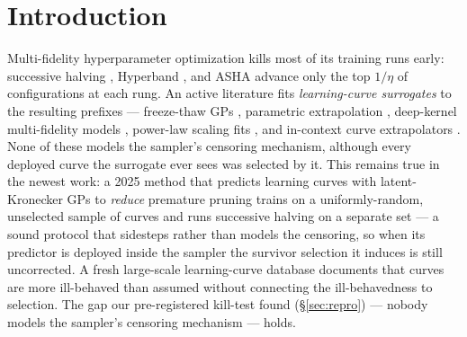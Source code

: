 \documentclass[10pt]{article}
\begin{document}
\begin{abstract}
posterior machinery cuts survivor-extrapolation bias at the first rung
from \ExtrapBiasNaive{} (naive least squares) to \ExtrapBiasHeckMB{};
a per-curve Tobit correction without the population prior manages only
\ExtrapBiasTobit{}, and an Arellano--Bond-flavoured lag-instrument
extrapolator is worse than the naive fit and is dropped. On LCBench and
PD1 replays the story is honestly mixed and matches the calibrated-noise
prediction: plain last-value SH is already near-optimal at decision
level; naive power-law extrapolation \emph{hurts} promotions and suffers
a winner's curse when picking from extrapolations
(top-decile prediction bias \TopBiasLCBPow{} on LCBench); the corrected
surrogate slashes that tail bias ($\sim$7$\times$, to \TopBiasLCBEB{}) and
ties last-value SH on LCBench decisions, but on PD1 it improves prediction
while \emph{worsening} decisions, and a one-parameter variance-penalty hack
captures most of the benefit for far less machinery --- a
prediction--decision gap we quantify rather than paper over.
\end{abstract}

\section{Introduction}
\label{sec:intro}

Multi-fidelity hyperparameter optimization kills most of its training
runs early: successive halving \citep{jamieson2016}, Hyperband
\citep{li2018hyperband}, and ASHA \citep{li2020asha} advance only the top
$1/\eta$ of configurations at each rung. An active literature fits
\emph{learning-curve surrogates} to the resulting prefixes --- freeze-thaw
GPs \citep{swersky2014}, parametric extrapolation
\citep{domhan2015,klein2017}, deep-kernel multi-fidelity models
\citep{wistuba2022dyhpo}, power-law scaling fits \citep{kadra2023dpl},
and in-context curve extrapolators \citep{adriaensen2023lcpfn,
rakotoarison2024ifbo}. None of these models the sampler's censoring
mechanism, although every deployed curve the surrogate ever sees was
selected by it. This remains true in the newest work: a 2025 method that
predicts learning curves with latent-Kronecker GPs to \emph{reduce}
premature pruning \citep{lin2025lkgp} trains on a uniformly-random,
unselected sample of curves and runs successive halving on a separate set
--- a sound protocol that sidesteps rather than models the censoring, so
when its predictor is deployed inside the sampler the survivor selection it
induces is still uncorrected. A fresh large-scale learning-curve database
documents that curves are more ill-behaved than assumed \citep{mohr2025lcdb}
without connecting the ill-behavedness to selection. The gap our
pre-registered kill-test found (\S\ref{sec:repro}) --- nobody models the
sampler's censoring mechanism --- holds.
\end{document}
